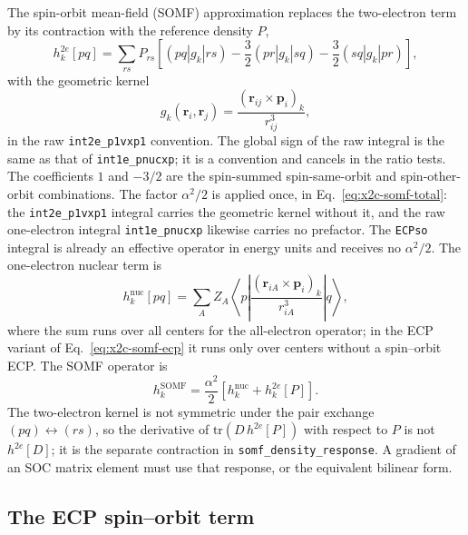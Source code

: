 The spin-orbit mean-field (SOMF) approximation replaces the
two-electron term by its contraction with the reference density $P$,
\begin{equation}
  h^{2e}_k[pq]
  = \sum_{rs}P_{rs}\left[
      (pq|g_k|rs)
      - \frac{3}{2}(pr|g_k|sq)
      - \frac{3}{2}(sq|g_k|pr)
    \right],
  \label{eq:x2c-somf}
\end{equation}
with the geometric kernel
\begin{equation}
  g_k(\mathbf r_i,\mathbf r_j)
  = \frac{\left(\mathbf r_{ij}\times\mathbf p_i\right)_k}
         {r_{ij}^{3}},
  \label{eq:x2c-somf-kernel}
\end{equation}
in the raw \texttt{int2e\_p1vxp1} convention.  The global sign of the
raw integral is the same as that of \texttt{int1e\_pnucxp}; it is a
convention and cancels in the ratio tests.  The coefficients $1$ and
$-3/2$ are the spin-summed spin-same-orbit and spin-other-orbit
combinations.  The factor $\alpha^{2}/2$ is applied once, in
Eq.~\eqref{eq:x2c-somf-total}: the \texttt{int2e\_p1vxp1} integral
carries the geometric kernel without it, and the raw one-electron
integral \texttt{int1e\_pnucxp} likewise carries no prefactor.  The
\texttt{ECPso} integral is already an effective operator in energy
units and receives no $\alpha^{2}/2$.  The one-electron nuclear term is
\begin{equation}
  h^{\mathrm{nuc}}_k[pq]
  = \sum_A Z_A
    \left\langle p\left|
      \frac{\left(\mathbf r_{iA}\times\mathbf p_i\right)_k}{r_{iA}^{3}}
    \right|q\right\rangle,
  \label{eq:x2c-nuclear-soc}
\end{equation}
where the sum runs over all centers for the all-electron operator; in
the ECP variant of Eq.~\eqref{eq:x2c-somf-ecp} it runs only over
centers without a spin--orbit ECP.  The SOMF operator is
\begin{equation}
  h^{\mathrm{SOMF}}_k
  = \frac{\alpha^{2}}{2}\left[h^{\mathrm{nuc}}_k+h^{2e}_k[P]\right].
  \label{eq:x2c-somf-total}
\end{equation}
The two-electron kernel is not symmetric under the pair exchange
$(pq)\leftrightarrow(rs)$, so the derivative of
$\mathrm{tr}(D\,h^{2e}[P])$ with respect to $P$ is not
$h^{2e}[D]$; it is the separate contraction in
\texttt{somf\_density\_response}.  A gradient of an SOC matrix element
must use that response, or the equivalent bilinear form.

\subsection{The ECP spin--orbit term}

